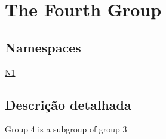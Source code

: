 \hypertarget{group__group4}{\section{The Fourth Group}
\label{group__group4}
}
\subsection*{Namespaces}
\begin{DoxyCompactItemize}
\item 
\hyperlink{namespace_n1}{N1}
\end{DoxyCompactItemize}


\subsection{Descrição detalhada}
Group 4 is a subgroup of group 3 